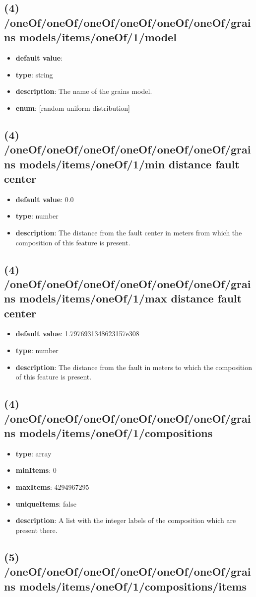 \subsection{(4) /oneOf/oneOf/oneOf/oneOf/oneOf/oneOf/grains models/items/oneOf/1/model}
\begin{itemize}[leftmargin=4em]\item {\bf default value}: 
\item {\bf type}: string
\item {\bf description}: The name of the grains model.
\item {\bf enum}: [random uniform distribution]\end{itemize}\subsection{(4) /oneOf/oneOf/oneOf/oneOf/oneOf/oneOf/grains models/items/oneOf/1/min distance fault center}
\begin{itemize}[leftmargin=4em]\item {\bf default value}: 0.0
\item {\bf type}: number
\item {\bf description}: The distance from the fault center in meters from which the composition of this feature is present.
\end{itemize}\subsection{(4) /oneOf/oneOf/oneOf/oneOf/oneOf/oneOf/grains models/items/oneOf/1/max distance fault center}
\begin{itemize}[leftmargin=4em]\item {\bf default value}: 1.7976931348623157e308
\item {\bf type}: number
\item {\bf description}: The distance from the fault in meters to which the composition of this feature is present.
\end{itemize}\subsection{(4) /oneOf/oneOf/oneOf/oneOf/oneOf/oneOf/grains models/items/oneOf/1/compositions}
\begin{itemize}[leftmargin=4em]\item {\bf type}: array
\item {\bf minItems}: 0
\item {\bf maxItems}: 4294967295
\item {\bf uniqueItems}: false
\item {\bf description}: A list with the integer labels of the composition which are present there.
\end{itemize}\subsection{(5) /oneOf/oneOf/oneOf/oneOf/oneOf/oneOf/grains models/items/oneOf/1/compositions/items}
